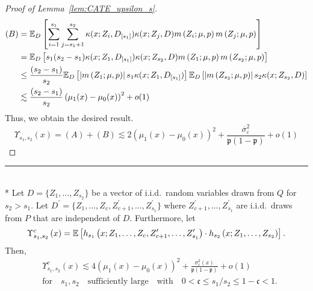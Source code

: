 \begin{proof}[Proof of Lemma~\ref{lem:CATE_upsilon_s}]
\begin{equation}
\begin{aligned}
			(B)
			& = \mathbb{E}_{D}\left[\sum_{i = 1}^{s_1}\sum_{j = s_1 + 1}^{s_2}\kappa(x; Z_{i}, D_{[s_1]})\kappa(x; Z_{j}, D) m\left(Z_{i}; \mu, p\right)m\left(Z_{j}; \mu, p\right)\right] \\
			& = \mathbb{E}_{D}\left[s_1(s_2 - s_1) \kappa(x; Z_{1}, D_{[s_1]})\kappa(x; Z_{s_2}, D) m\left(Z_{1}; \mu, p\right) m\left(Z_{s_2}; \mu, p\right)\right]\\
			& \leq \frac{(s_2 - s_1)}{s_2}\mathbb{E}_{D}\left[\left|m\left(Z_{1}; \mu, p\right)\right| s_1 \kappa(x; Z_{1}, D_{[s_1]})\right]
			\mathbb{E}_{D}\left[\left|m\left(Z_{s_2}; \mu, p\right)\right| s_2\kappa(x; Z_{s_2}, D) \right]\\
			& \lesssim \frac{(s_2 - s_1)}{s_2} \left(\mu_1(x) - \mu_0(x)\right)^2 + o(1)
		\end{aligned}
	\end{equation}
	Thus, we obtain the desired result.
	\begin{equation}
		\Upsilon_{s_1, s_2}\left(x\right)
		= (A) + (B)
		\lesssim  2\left(\mu_1(x) - \mu_0(x)\right)^2 + \frac{\overline{\sigma}^2_{\varepsilon}}{\mathfrak{p}(1 - \mathfrak{p})} + o(1)
	\end{equation}
\end{proof}
\hrule 

\begin{lem}\label{lem:CATE_upsilon_sc}\mbox{}\\*
	Let $D = \{Z_1, \dotsc, Z_{s_2}\}$ be a vector of i.i.d.\ random variables drawn from $Q$ for $s_2 > s_1$.
	Let $D^{\prime} = \{Z_1, \dotsc, Z_{c}, Z_{c+1}^{\prime}, \dotsc,  Z_{s_1}^{\prime}\}$ where $Z_{c+1}^{\prime}, \dotsc,  Z_{s_1}^{\prime}$ are i.i.d.\ draws from $P$ that are independent of $D$.
	Furthermore, let
	\begin{equation}
		\Upsilon_{s_1, s_2}^{c}\left(x\right)
		= \mathbb{E}\left[h_{s_1}\left(x; Z_1, \ldots, Z_c, Z^{\prime}_{c+1}, \ldots,  Z^{\prime}_{s_1}\right) \cdot
			h_{s_2}\left(x; Z_1, \ldots, Z_{s_2}\right)\right].
	\end{equation}
	Then,
	\begin{equation}
		\begin{aligned}
			 & \Upsilon_{s_1, s_2}^{c}\left(x\right)
			\lesssim 4 \left(\mu_1(x) - \mu_0(x)\right)^2 + \frac{\sigma^2_{\varepsilon}(x)}{\mathfrak{p}(1 - \mathfrak{p})} + o(1) \\
			 & \text{for} \quad s_1, s_2 \quad \text{sufficiently large}
			\quad \text{with} \quad
			0 < \mathfrak{c} \leq s_1 / s_2 \leq 1 - \mathfrak{c} < 1.
		\end{aligned}
	\end{equation}
\end{lem}

